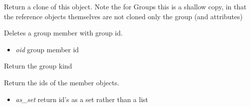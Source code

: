 \documentclass[a4paper,11pt,english]{sphinxmanual}
\begin{document}
\begin{fulllineitems}
\begin{fulllineitems}
\begin{itemize}
\end{itemize}

\end{fulllineitems}


\begin{fulllineitems}
\label{modules_doc:cbmpy.CBModel.Group.clone}
Return a clone of this object. Note the for Groups this is a shallow copy, in that the reference
objects themselves are not cloned only the group (and attributes)

\end{fulllineitems}


\begin{fulllineitems}
\label{modules_doc:cbmpy.CBModel.Group.deleteMember}
Deletes a group member with group id.
\begin{itemize}
\item {} 
\emph{oid} group member id

\end{itemize}

\end{fulllineitems}


\begin{fulllineitems}
\label{modules_doc:cbmpy.CBModel.Group.getKind}
Return the group kind

\end{fulllineitems}


\begin{fulllineitems}
\label{modules_doc:cbmpy.CBModel.Group.getMemberIDs}
Return the ids of the member objects.
\begin{itemize}
\item {} 
\emph{as\_set} return id's as a set rather than a list

\end{itemize}

\end{fulllineitems}



\end{fulllineitems}
\end{document}

